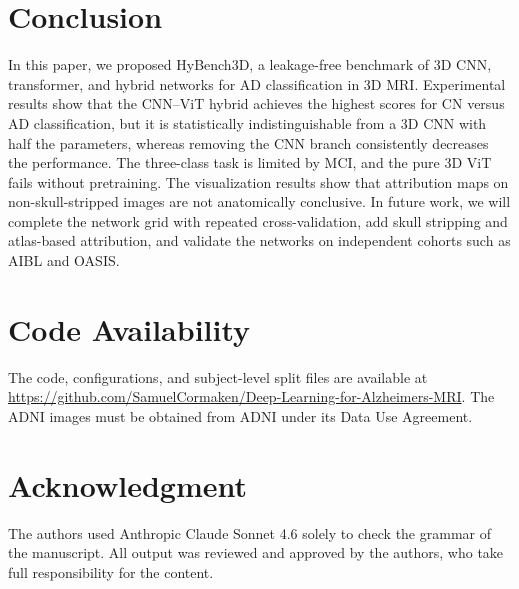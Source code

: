 \documentclass[conference,a4paper]{IEEEtran}
\begin{document}
\section{Conclusion}
In this paper, we proposed HyBench3D, a leakage-free benchmark of 3D CNN, transformer, and hybrid networks for AD classification in 3D MRI. Experimental results show that the CNN--ViT hybrid achieves the highest scores for CN versus AD classification, but it is statistically indistinguishable from a 3D CNN with half the parameters, whereas removing the CNN branch consistently decreases the performance. The three-class task is limited by MCI, and the pure 3D ViT fails without pretraining. The visualization results show that attribution maps on non-skull-stripped images are not anatomically conclusive. In future work, we will complete the network grid with repeated cross-validation, add skull stripping and atlas-based attribution, and validate the networks on independent cohorts such as AIBL and OASIS.

\section*{Code Availability}
The code, configurations, and subject-level split files are available at \url{https://github.com/SamuelCormaken/Deep-Learning-for-Alzheimers-MRI}. The ADNI images must be obtained from ADNI under its Data Use Agreement.

\section*{Acknowledgment}
{\footnotesize The authors used Anthropic Claude Sonnet 4.6 solely to check the grammar of the manuscript. All output was reviewed and approved by the authors, who take full responsibility for the content.}
\end{document}

